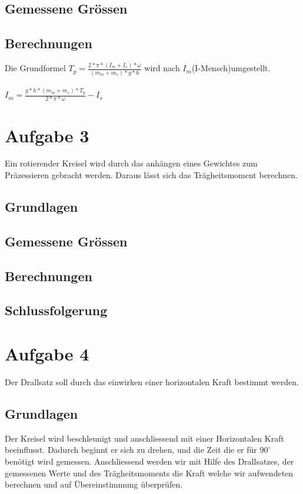\documentclass{article}
\begin{document}
\subsection{Gemessene Grössen}
\subsection{Berechnungen}
Die Grundformel
$T_p = \frac{2*\pi*(I_m+I_s)*\omega}{(m_m+m_s)*g*h} $ wird nach $I_m$(I-Mensch)umgestellt.\\\\
$I_m = \frac{g*h*(m_m+m_s)*T_p}{2*\pi*\omega}-I_s$




\section{Aufgabe 3}
Ein rotierender Kreisel wird durch das anhängen eines Gewichtes zum Präzessieren gebracht werden. Daraus lässt sich das Trägheitsmoment berechnen. 
\subsection{Grundlagen}
\subsection{Gemessene Grössen}
\subsection{Berechnungen}
\subsection{Schlussfolgerung}

\section{Aufgabe 4}
Der Drallsatz soll durch das einwirken einer horizontalen Kraft bestimmt werden.
\subsection{Grundlagen}
Der Kreisel wird beschleunigt und anschliessend mit einer Horizontalen Kraft beeinflusst. Dadurch 
beginnt er sich zu drehen, und die Zeit die er für $90^\circ$ benötigt wird gemessen. 
Anschliessend werden wir mit Hilfe des Drallsatzes, der gemessenen Werte und des 
Trägheitsmoments die Kraft welche wir aufwendeten berechnen und auf Übereinstimmung 
überprüfen. 
\end{document}
